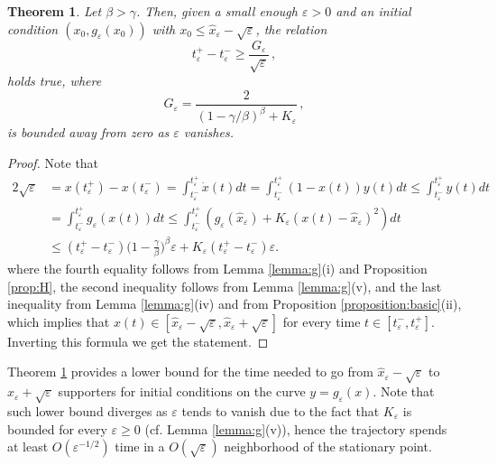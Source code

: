 \documentclass{article}
\newtheorem{theorem}{Theorem}[section]
\begin{document}
\begin{theorem}\label{thm:incubation}
Let $\beta > \gamma$. Then, given a small enough $\varepsilon > 0$ and an initial condition $(x_0,g_\varepsilon(x_0))$ with $x_0 \le \hat x_\varepsilon - \sqrt{\varepsilon}$, the relation
$$t^+_{\varepsilon} - t^-_{\varepsilon} \geq \frac{G_\varepsilon}{\sqrt{\varepsilon}}\,,$$ 
holds true, where $$G_\varepsilon = \displaystyle\frac{2}{(1 - \gamma/\beta)^{\beta} + K_\varepsilon}\,,$$
is bounded away from zero as $\varepsilon$ vanishes.
\end{theorem}

\begin{proof}
Note that
    \begin{align*}
        2\sqrt{\varepsilon} &= x(t^+_{\varepsilon}) - x(t^-_{\varepsilon}) = \int_{t^-_{\varepsilon}}^{t^+_{\varepsilon}}\dot{x}(t)dt = \int_{t^-_{\varepsilon}}^{t^+_\varepsilon}(1 - x(t))y(t)dt \leq \int_{t^-_{\varepsilon}}^{t^+_{\varepsilon}}y(t)dt \\
            & = \int_{t^-_{\varepsilon}}^{t^+_{\varepsilon}}g_{\varepsilon}(x(t))dt \leq \int_{t^-_{\varepsilon}}^{t^+_{\varepsilon}}(g_{\varepsilon}(\hat{x}_\varepsilon)+K_{\varepsilon}(x(t)-\hat{x}_{\varepsilon})^2)dt \\[5pt]
            & \leq (t^+_{\varepsilon}-t^-_{\varepsilon})\Big(1 - \displaystyle\frac{\gamma}{\beta}\Big)^{\beta}\varepsilon + K_{\varepsilon}(t^+_{\varepsilon}-t^-_{\varepsilon})\varepsilon.
    \end{align*}
    where the fourth equality follows from Lemma \ref{lemma:g}(i) and Proposition \ref{prop:H}, the second inequality follows from Lemma \ref{lemma:g}(v), and the last inequality from Lemma \ref{lemma:g}(iv) and from Proposition \ref{proposition:basic}(ii), which implies that $x(t) \in [\hat x_\varepsilon - \sqrt{\varepsilon}, \hat x_\varepsilon + \sqrt{\varepsilon}]$ for every time $t \in [t_\varepsilon^-,t_\varepsilon^+]$. Inverting this formula we get the statement.
\end{proof}

Theorem \ref{thm:incubation} provides a lower bound for the time needed to go from $\hat x_{\varepsilon} - \sqrt\varepsilon$ to $\hat x_{\varepsilon} + \sqrt\varepsilon$ supporters for initial conditions on the curve $y = g_\varepsilon(x)$. Note that such lower bound diverges as $\varepsilon$ tends to vanish due to the fact that $K_{\varepsilon}$ is bounded for every $\varepsilon \ge 0$ (cf. Lemma \ref{lemma:g}(v)), hence the trajectory spends at least $O(\varepsilon^{-1/2})$ time in a $O(\sqrt\varepsilon)$ neighborhood of the stationary point.
\end{document}
